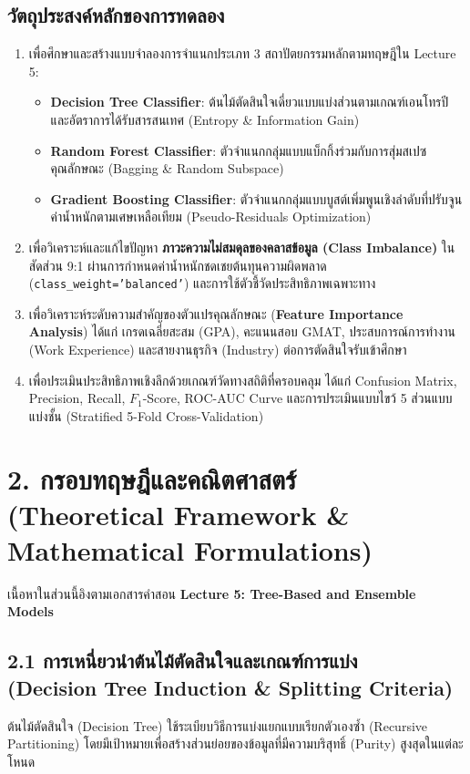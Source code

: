 \documentclass[12pt,a4paper]{article}
\begin{document}
\subsection*{วัตถุประสงค์หลักของการทดลอง}
\begin{enumerate}[leftmargin=18pt, itemsep=2pt]
    \item เพื่อศึกษาและสร้างแบบจำลองการจำแนกประเภท 3 สถาปัตยกรรมหลักตามทฤษฎีใน Lecture 5:
    \begin{itemize}
        \item \textbf{Decision Tree Classifier}: ต้นไม้ตัดสินใจเดี่ยวแบบแบ่งส่วนตามเกณฑ์เอนโทรปีและอัตราการได้รับสารสนเทศ (Entropy \& Information Gain)
        \item \textbf{Random Forest Classifier}: ตัวจำแนกกลุ่มแบบแบ็กกิ้งร่วมกับการสุ่มสเปซคุณลักษณะ (Bagging \& Random Subspace)
        \item \textbf{Gradient Boosting Classifier}: ตัวจำแนกกลุ่มแบบบูสต์เพิ่มพูนเชิงลำดับที่ปรับจูนค่าน้ำหนักตามเศษเหลือเทียม (Pseudo-Residuals Optimization)
    \end{itemize}
    \item เพื่อวิเคราะห์และแก้ไขปัญหา \textbf{ภาวะความไม่สมดุลของคลาสข้อมูล (Class Imbalance)} ในสัดส่วน 9:1 ผ่านการกำหนดค่าน้ำหนักชดเชยต้นทุนความผิดพลาด (\texttt{class\_weight='balanced'}) และการใช้ตัวชี้วัดประสิทธิภาพเฉพาะทาง
    \item เพื่อวิเคราะห์ระดับความสำคัญของตัวแปรคุณลักษณะ (\textbf{Feature Importance Analysis}) ได้แก่ เกรดเฉลี่ยสะสม (GPA), คะแนนสอบ GMAT, ประสบการณ์การทำงาน (Work Experience) และสายงานธุรกิจ (Industry) ต่อการตัดสินใจรับเข้าศึกษา
    \item เพื่อประเมินประสิทธิภาพเชิงลึกด้วยเกณฑ์วัดทางสถิติที่ครอบคลุม ได้แก่ Confusion Matrix, Precision, Recall, $F_1$-Score, ROC-AUC Curve และการประเมินแบบไขว้ 5 ส่วนแบบแบ่งชั้น (Stratified 5-Fold Cross-Validation)
\end{enumerate}

\section*{2. กรอบทฤษฎีและคณิตศาสตร์\\ \large(Theoretical Framework \& Mathematical Formulations)}

เนื้อหาในส่วนนี้อิงตามเอกสารคำสอน \textbf{Lecture 5: Tree-Based and Ensemble Models}

\subsection*{2.1 การเหนี่ยวนำต้นไม้ตัดสินใจและเกณฑ์การแบ่ง\\ \normalsize(Decision Tree Induction \& Splitting Criteria)}
ต้นไม้ตัดสินใจ (Decision Tree) ใช้ระเบียบวิธีการแบ่งแยกแบบเรียกตัวเองซ้ำ (Recursive Partitioning) โดยมีเป้าหมายเพื่อสร้างส่วนย่อยของข้อมูลที่มีความบริสุทธิ์ (Purity) สูงสุดในแต่ละโหนด
\end{document}
